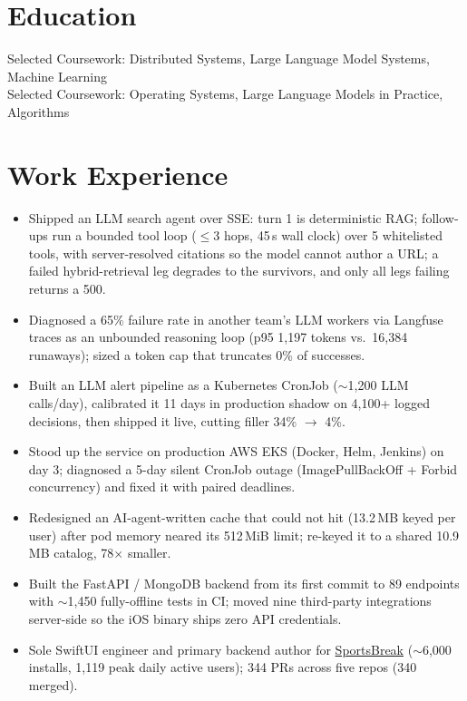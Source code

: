 \documentclass[11pt, letterpaper]{article}
\begin{document}

\section{Education}
Selected Coursework: Distributed Systems, Large Language Model Systems, Machine Learning\\[1pt]
Selected Coursework: Operating Systems, Large Language Models in Practice, Algorithms

\section{Work Experience}
\begin{itemize}
  \item Shipped an LLM search agent over SSE: turn 1 is deterministic RAG; follow-ups run a bounded tool loop ($\le$3 hops, 45\,s wall clock) over 5 whitelisted tools, with server-resolved citations so the model cannot author a URL; a failed hybrid-retrieval leg degrades to the survivors, and only all legs failing returns a 500.
  \item Diagnosed a 65\% failure rate in another team's LLM workers via Langfuse traces as an unbounded reasoning loop (p95 1{,}197 tokens vs.\ 16{,}384 runaways); sized a token cap that truncates 0\% of successes.
  \item Built an LLM alert pipeline as a Kubernetes CronJob ($\sim$1{,}200 LLM calls/day), calibrated it 11 days in production shadow on 4{,}100+ logged decisions, then shipped it live, cutting filler 34\% $\to$ 4\%.
  \item Stood up the service on production AWS EKS (Docker, Helm, Jenkins) on day 3; diagnosed a 5-day silent CronJob outage (ImagePullBackOff + Forbid concurrency) and fixed it with paired deadlines.
  \item Redesigned an AI-agent-written cache that could not hit (13.2\,MB keyed per user) after pod memory neared its 512\,MiB limit; re-keyed it to a shared 10.9\,MB catalog, 78$\times$ smaller.
  \item Built the FastAPI / MongoDB backend from its first commit to 89 endpoints with $\sim$1{,}450 fully-offline tests in CI; moved nine third-party integrations server-side so the iOS binary ships zero API credentials.
  \item Sole SwiftUI engineer and primary backend author for \href{https://apps.apple.com/app/id6762649287}{SportsBreak} ($\sim$6{,}000 installs, 1{,}119 peak daily active users); 344 PRs across five repos (340 merged).
\end{itemize}
\end{document}
